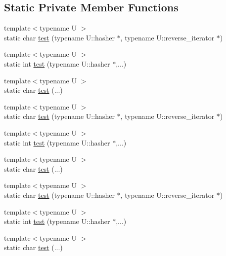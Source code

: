 \subsection*{Static Private Member Functions}
\begin{DoxyCompactItemize}
\item 
{\footnotesize template$<$typename U $>$ }\\static char \mbox{\hyperlink{structtesting_1_1internal_1_1_is_hash_table_acc4d1e2307a1e0527932da7a7d354f06}{test}} (typename U\+::hasher $\ast$, typename U\+::reverse\+\_\+iterator $\ast$)
\item 
{\footnotesize template$<$typename U $>$ }\\static int \mbox{\hyperlink{structtesting_1_1internal_1_1_is_hash_table_a195b49a6ae5090b6266a5fa4ab771962}{test}} (typename U\+::hasher $\ast$,...)
\item 
{\footnotesize template$<$typename U $>$ }\\static char \mbox{\hyperlink{structtesting_1_1internal_1_1_is_hash_table_a40461295b959ff31e06241d4de072be0}{test}} (...)
\item 
{\footnotesize template$<$typename U $>$ }\\static char \mbox{\hyperlink{structtesting_1_1internal_1_1_is_hash_table_acc4d1e2307a1e0527932da7a7d354f06}{test}} (typename U\+::hasher $\ast$, typename U\+::reverse\+\_\+iterator $\ast$)
\item 
{\footnotesize template$<$typename U $>$ }\\static int \mbox{\hyperlink{structtesting_1_1internal_1_1_is_hash_table_a195b49a6ae5090b6266a5fa4ab771962}{test}} (typename U\+::hasher $\ast$,...)
\item 
{\footnotesize template$<$typename U $>$ }\\static char \mbox{\hyperlink{structtesting_1_1internal_1_1_is_hash_table_a40461295b959ff31e06241d4de072be0}{test}} (...)
\item 
{\footnotesize template$<$typename U $>$ }\\static char \mbox{\hyperlink{structtesting_1_1internal_1_1_is_hash_table_acc4d1e2307a1e0527932da7a7d354f06}{test}} (typename U\+::hasher $\ast$, typename U\+::reverse\+\_\+iterator $\ast$)
\item 
{\footnotesize template$<$typename U $>$ }\\static int \mbox{\hyperlink{structtesting_1_1internal_1_1_is_hash_table_a195b49a6ae5090b6266a5fa4ab771962}{test}} (typename U\+::hasher $\ast$,...)
\item 
{\footnotesize template$<$typename U $>$ }\\static char \mbox{\hyperlink{structtesting_1_1internal_1_1_is_hash_table_a40461295b959ff31e06241d4de072be0}{test}} (...)
\end{DoxyCompactItemize}


